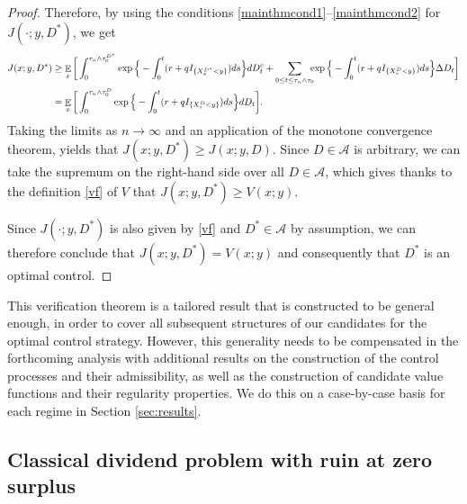 \documentclass[11pt]{article} %
\def\A{\mathcal A}
\DeclareMathOperator{\E}{\mathbb E}
\numberwithin{komcounter}{section}
\numberwithin{equation}{section}
\numberwithin{theorem}{section}
\begin{document}
\begin{proof}
Therefore, by using the conditions \eqref{mainthmcond1}--\eqref{mainthmcond2} for $J(\cdot;y,D^*)$, we get
\begin{align*}
J(x;y,D^*) &\geq \E_x\bigg[\int_0^{\tau_n\wedge\tau_0^{D^*}} \exp\Big\{-\int_0^{t} (r + qI_{\{X^{D^*}_s<y\}})ds \Big\} dD^c_t + \sum_{0\leq t\leq \tau_n\wedge\tau_0} \hspace{-2mm}\exp\Big\{-\int_0^{t} (r + qI_{\{X^D_s<y\}})ds \Big\} \Delta D_t \bigg] \\ 
&= \E_x\bigg[\int_0^{\tau_n\wedge\tau_0^D} \exp\Big\{-\int_0^{t} (r + qI_{\{X^D_s<y\}})ds \Big\} dD_t \bigg].
\end{align*}
Taking the limits as $n \to \infty$ and an application of the monotone convergence theorem, yields that $J(x;y,D^*) \geq J(x;y,D)$. 
Since $D \in \A$ is arbitrary, we can take the supremum on the right-hand side over all $D \in \A$, which gives thanks to the definition \eqref{vf} of $V$ that $J(x;y,D^*) \geq V(x;y)$. 

Since $J(\cdot;y,D^*)$ is also given by \eqref{vf} and $D^*\in\mathcal{A}$ by assumption, we can therefore conclude that $J(x;y,D^*) = V(x;y)$ and consequently that $D^*$ is an optimal control.
\end{proof}

This verification theorem is a tailored result that is constructed to be general enough, in order to cover all subsequent structures of our candidates for the optimal control strategy. 
However, this generality needs to be compensated in the forthcoming analysis with additional results on the construction of the control processes and their admissibility, as well as the construction of candidate value functions and their regularity properties.
We do this on a case-by-case basis for each regime in Section \ref{sec:results}.



\subsection{Classical dividend problem with ruin at zero surplus} 
\label{chapter_classical_case}
\end{document}
